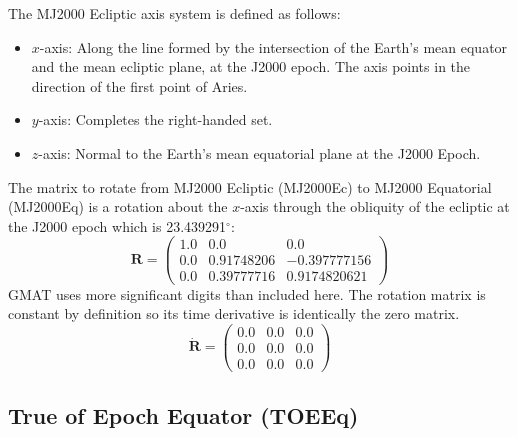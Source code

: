 {The MJ2000 Ecliptic axis system is defined as follows:
%
\begin{itemize}
\item $x$-axis:  Along the line formed by the intersection of the Earth's mean
                 equator and the mean ecliptic plane, at the J2000
                 epoch.  The axis points in the direction of the
                 first point of Aries.
%
\item $y$-axis:  Completes the right-handed set.
%
\item $z$-axis:  Normal to the Earth's mean equatorial plane at the J2000 Epoch.
\end{itemize}
%
The matrix to rotate from MJ2000 Ecliptic (MJ2000Ec)  to MJ2000
Equatorial  (MJ2000Eq) is a rotation about the $x$-axis through the
obliquity of the ecliptic at the J2000 epoch which is
23.439291$^\circ$:
%
\begin{equation}
  \mathbf{R} =   \begin{pmatrix}
     1.0 & 0.0 & 0.0\\
     0.0 & 0.91748206 & -0.397777156\\
     0.0 & 0.39777716 & 0.9174820621
     \end{pmatrix} \label{Eq:Ec2Eq}
\end{equation}
%
GMAT uses more significant digits than included here.  The rotation
matrix is constant by definition so its time derivative is
identically the zero matrix.
%
\begin{equation}
  \dot{\mathbf{R}} =   \begin{pmatrix}
     0.0 & 0.0 & 0.0\\
     0.0 & 0.0 & 0.0\\
     0.0 & 0.0 & 0.0
     \end{pmatrix}
\end{equation}

\subsection{True of Epoch Equator (TOEEq) }
\label{Sec:TOEEq} 

}

